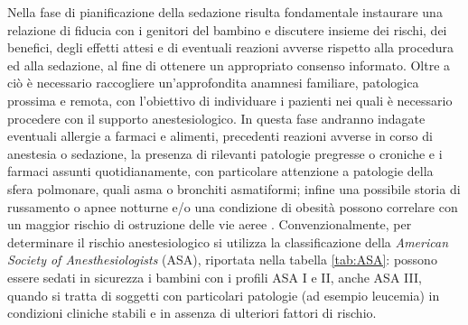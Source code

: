 Nella fase di pianificazione della sedazione risulta fondamentale instaurare una relazione di fiducia con i genitori del bambino e discutere insieme dei rischi, dei benefici, degli effetti attesi e di eventuali reazioni avverse rispetto alla procedura ed alla sedazione, al fine di ottenere un appropriato consenso informato. Oltre a ciò è necessario raccogliere un'approfondita anamnesi familiare, patologica prossima e remota, con l'obiettivo di individuare i pazienti nei quali è necessario procedere con il supporto anestesiologico. In questa fase andranno indagate eventuali allergie a farmaci e alimenti, precedenti reazioni avverse in corso di anestesia o sedazione, la presenza di rilevanti patologie pregresse o croniche e i farmaci assunti quotidianamente, con particolare attenzione a patologie della sfera polmonare, quali asma o bronchiti asmatiformi; infine una possibile storia di russamento o apnee notturne e/o una condizione di obesità possono correlare con un maggior rischio di ostruzione delle vie aeree \cite{Simeupsedazione, Guidelines2019}.
Convenzionalmente, per determinare il rischio anestesiologico si utilizza la classificazione della \emph {American Society of Anesthesiologists} (ASA), riportata nella tabella \ref{tab:ASA}: possono essere sedati in sicurezza i bambini con i profili ASA I e II, anche ASA III, quando si tratta di soggetti con particolari patologie (ad esempio leucemia) in condizioni cliniche stabili e in assenza di ulteriori fattori di rischio. 

\bigskip

